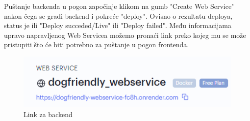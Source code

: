             Puštanje backenda u pogon započinje klikom na gumb "Create Web Service" nakon čega se gradi backend i pokreće "deploy". Ovisno o rezultatu deploya, status je ili "Deploy succeded/Live" ili "Deploy failed". Među informacijama upravo napravljenog Web Servicea možemo pronaći link preko kojeg mu se može pristupiti što će biti potrebno za puštanje u pogon frontenda.
            \begin{figure}[H]
			    \includegraphics[width=\textwidth]{slike/deploy7.png} 
			        \caption{Link za backend}
			    \label{fig:Link za backend}
		    \end{figure}
            \newpage

